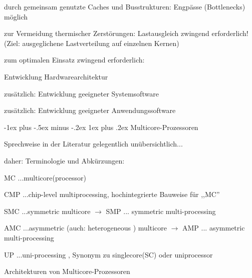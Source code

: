 \documentclass[a4paper]{article}
\makeatletter
\renewcommand{\subsubsection}{\@startsection{subsubsection}{3}{0mm}%
 {-1ex plus -.5ex minus -.2ex}%
 {1ex plus .2ex}%
 {\normalfont\small\bfseries}}
\makeatother
\begin{document}
\begin{multicols}{3}
    \begin{enumerate*}
        \item durch gemeinsam genutzte Caches und Busstrukturen: Engpässe
        (Bottlenecks) möglich
        \item zur Vermeidung thermischer Zerstörungen: Lastausgleich zwingend
        erforderlich! (Ziel: ausgeglichene Lastverteilung auf einzelnen
        Kernen)
        \item zum optimalen Einsatz zwingend erforderlich:
        \begin{enumerate*}
            \item Entwicklung Hardwarearchitektur
            \item zusätzlich: Entwicklung geeigneter Systemsoftware
            \item zusätzlich: Entwicklung geeigneter Anwendungssoftware
        \end{enumerate*}
    \end{enumerate*}


    \subsubsection{Multicore-Prozessoren}

    \begin{itemize*}
        \item Sprechweise in der Literatur gelegentlich unübersichtlich...
        \item daher: Terminologie und Abkürzungen:
        \begin{itemize*}
            \item MC ...multicore(processor)
            \item CMP ...chip-level multiprocessing, hochintegrierte Bauweise für ,,MC''
            \item SMC ...symmetric multicore $\rightarrow$ SMP ... symmetric multi-processing
            \item AMC ...asymmetric (auch: heterogeneous ) multicore $\rightarrow$ AMP ... asymmetric multi-processing
            \item UP ...uni-processing , Synonym zu singlecore(SC) oder uniprocessor
        \end{itemize*}
    \end{itemize*}

    Architekturen von Multicore-Prozessoren


\end{multicols}
\end{document}
